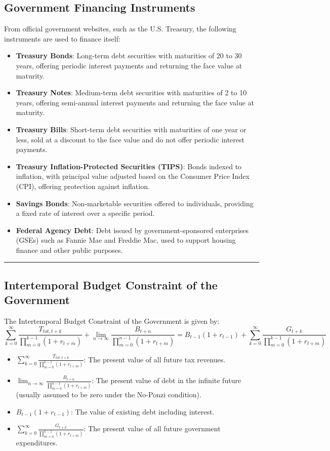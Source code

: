 \documentclass{article}
\begin{document}
\subsection{Government Financing Instruments}
From official government websites, such as the U.S. Treasury, the following instruments are used to finance itself:
\begin{itemize}
    \item \textbf{Treasury Bonds}: Long-term debt securities with maturities of 20 to 30 years, offering periodic interest payments and returning the face value at maturity.
    \item \textbf{Treasury Notes}: Medium-term debt securities with maturities of 2 to 10 years, offering semi-annual interest payments and returning the face value at maturity.
    \item \textbf{Treasury Bills}: Short-term debt securities with maturities of one year or less, sold at a discount to the face value and do not offer periodic interest payments.
    \item \textbf{Treasury Inflation-Protected Securities (TIPS)}: Bonds indexed to inflation, with principal value adjusted based on the Consumer Price Index (CPI), offering protection against inflation.
    \item \textbf{Savings Bonds}: Non-marketable securities offered to individuals, providing a fixed rate of interest over a specific period.
    \item \textbf{Federal Agency Debt}: Debt issued by government-sponsored enterprises (GSEs) such as Fannie Mae and Freddie Mac, used to support housing finance and other public purposes.
\end{itemize}

\noindent\rule{\linewidth}{0.5pt}

\subsection{Intertemporal Budget Constraint of the Government}
The Intertemporal Budget Constraint of the Government is given by:
\[
\sum_{k=0}^{\infty} \frac{T_{tot,t+k}}{\prod_{m=0}^{k-1} (1 + r_{t+m})} + \lim_{n \to \infty} \frac{B_{t+n}}{\prod_{m=0}^{n-1} (1 + r_{t+m})} = B_{t-1} (1 + r_{t-1}) + \sum_{k=0}^{\infty} \frac{G_{t+k}}{\prod_{m=0}^{k-1} (1 + r_{t+m})}
\]

\begin{itemize}
    \item \(\sum_{k=0}^{\infty} \frac{T_{tot,t+k}}{\prod_{m=0}^{k-1} (1 + r_{t+m})}\): The present value of all future tax revenues.
    \item \(\lim_{n \to \infty} \frac{B_{t+n}}{\prod_{m=0}^{n-1} (1 + r_{t+m})}\): The present value of debt in the infinite future (usually assumed to be zero under the No-Ponzi condition).
    \item \(B_{t-1} (1 + r_{t-1})\): The value of existing debt including interest.
    \item \(\sum_{k=0}^{\infty} \frac{G_{t+k}}{\prod_{m=0}^{k-1} (1 + r_{t+m})}\): The present value of all future government expenditures.
\end{itemize}
\end{document}
